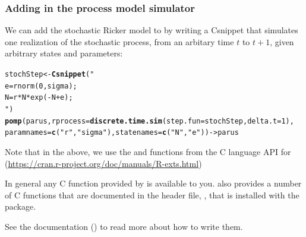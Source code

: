\documentclass{beamer}\usepackage[]{graphicx}\usepackage[]{color}
\makeatletter
\newcommand{\hlnum}[1]{\textcolor[rgb]{0.686,0.059,0.569}{#1}}%
\newcommand{\hlstr}[1]{\textcolor[rgb]{0.192,0.494,0.8}{#1}}%
\newcommand{\hlstd}[1]{\textcolor[rgb]{0.345,0.345,0.345}{#1}}%
\newcommand{\hlkwb}[1]{\textcolor[rgb]{0.69,0.353,0.396}{#1}}%
\newcommand{\hlkwc}[1]{\textcolor[rgb]{0.333,0.667,0.333}{#1}}%
\newcommand{\hlkwd}[1]{\textcolor[rgb]{0.737,0.353,0.396}{\textbf{#1}}}%
\newenvironment{kframe}{%
 \def\at@end@of@kframe{}%
 \ifinner\ifhmode%
  \def\at@end@of@kframe{\end{minipage}}%
  \begin{minipage}{\columnwidth}%
 \fi\fi%
 \def\FrameCommand##1{\hskip\@totalleftmargin \hskip-\fboxsep
 \colorbox{shadecolor}{##1}\hskip-\fboxsep
     \hskip-\linewidth \hskip-\@totalleftmargin \hskip\columnwidth}%
 \MakeFramed {\advance\hsize-\width
   \@totalleftmargin\z@ \linewidth\hsize
   \@setminipage}}%
 {\par\unskip\endMakeFramed%
 \at@end@of@kframe}
\newenvironment{knitrout}{}{} %
\makeatother
\begin{document}
\begin{frame}[fragile] 

\frametitle{Adding in the process model simulator}

\bi
\item We can add the stochastic Ricker model to  by writing a Csnippet that simulates one realization of the stochastic process, from an arbitary time $t$ to $t+1$, given arbitrary states and parameters:
\ei
\begin{knitrout}\small
{}\color{fgcolor}\begin{kframe}
\begin{alltt}
\hlstd{stochStep} \hlkwb{<-} \hlkwd{Csnippet}\hlstd{(}\hlstr{"
  e = rnorm(0,sigma);
  N = r*N*exp(-N+e);
"}\hlstd{)}
\hlkwd{pomp}\hlstd{(parus,}\hlkwc{rprocess}\hlstd{=}\hlkwd{discrete.time.sim}\hlstd{(}\hlkwc{step.fun}\hlstd{=stochStep,}\hlkwc{delta.t}\hlstd{=}\hlnum{1}\hlstd{),}
     \hlkwc{paramnames}\hlstd{=}\hlkwd{c}\hlstd{(}\hlstr{"r"}\hlstd{,}\hlstr{"sigma"}\hlstd{),}\hlkwc{statenames}\hlstd{=}\hlkwd{c}\hlstd{(}\hlstr{"N"}\hlstd{,}\hlstr{"e"}\hlstd{))} \hlkwb{->} \hlstd{parus}
\end{alltt}
\end{kframe}
\end{knitrout}

\bi

\item Note that in the above, we use the  and  functions from the  C language API for {\R} 
(\url{https://cran.r-project.org/doc/manuals/R-exts.html})

\item In general any C function provided by {\R} is available to you.
 also provides a number of C functions that are documented in the header file, , that is installed with the package.

\item See the  documentation () to read more about how to write them.



\ei

\end{frame}
\end{document}
